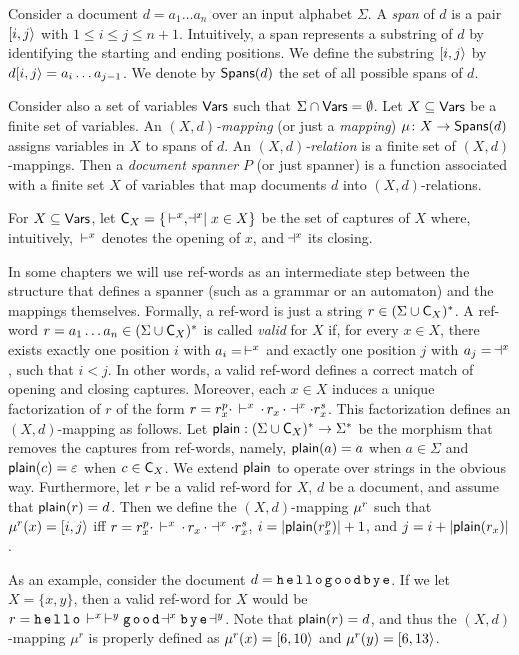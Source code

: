 Consider a document $d = a_1\ldots a_n$ over an input alphabet $\Sigma$. A {\it span} of $d$ is a pair $[i,j\rangle$ with $1 \leq i \leq j \leq n+1$. Intuitively, a span represents a substring of $d$ by identifying the starting and ending positions. We define the substring $[i,j\rangle$ by $d[i,j\rangle = a_i \ldots a_{j-1}$. We denote by $\mathsf{Spans}(d)$ the set of all possible spans of $d$.

Consider also a set of variables $\mathsf{Vars}$ such that $\Sigma \cap \mathsf{Vars} = \emptyset$. Let $X \subseteq \mathsf{Vars}$ be a finite set of variables. An \emph{$(X, d)$-mapping} (or just a \emph{mapping}) $\mu\colon X \rightarrow \mathsf{Spans}(d)$ assigns variables in $X$ to spans of $d$. An \emph{$(X, d)$-relation} is a finite set of $(X, d)$-mappings. Then a \emph{document spanner} $P$ (or just spanner) is a function associated with a finite set $X$ of variables that map documents $d$ into $(X, d)$-relations.  

For $X \subseteq \mathsf{Vars}$, let $\textsf{C}_{X} = \{\, \vdash^{x}, \!\dashv^{x}\mid x\in X\}$ be the set of captures of $X$ where, intuitively, $\, \vdash^{x}$ denotes the opening of $x$, and $\!\dashv^{x}$ its closing. 

In some chapters we will use ref-words as an intermediate step between the structure that defines a spanner (such as a grammar or an automaton) and the mappings themselves.
Formally, a ref-word is just a string $r\in (\Sigma \cup \textsf{C}_{X})^*$. A ref-word $r = a_1 \ldots a_n \in (\Sigma \cup \textsf{C}_{X})^*$ is called {\it valid} for $X$ if, for every $x \in X$, there exists exactly one position $i$ with $a_i = \, \vdash^{x}$ and exactly one position $j$ with $a_j = \ \!\dashv^{x}$, such that $i < j$. 
In other words, a valid ref-word defines a correct match of opening and closing captures. Moreover, each $x \in X$ induces a unique factorization of $r$ of the form $r = r_x^p \cdot \, \vdash^{x} \, \cdot \, r_x \, \cdot\, \!\dashv^{x} \cdot r_x^s$. 
This factorization defines an $(X,d)$-mapping as follows. 
Let $\textsf{plain}: (\Sigma \cup \textsf{C}_{X})^* \rightarrow \Sigma^*$ be the morphism that removes the captures from ref-words, namely, $\textsf{plain}(a) = a$ when $a \in \Sigma$ and $\textsf{plain}(c) = \varepsilon$ when $c \in \textsf{C}_{X}$.
We extend $\textsf{plain}$ to operate over strings in the obvious way.
Furthermore, let $r$ be a valid ref-word for $X$, $d$ be a document, and assume that $\textsf{plain}(r) = d$.
Then we define the $(X,d)$-mapping $\mu^r$ such that $\mu^r(x) = [i,j\rangle$ iff $r = r_x^p \cdot \, \vdash^{x} \, \cdot \, r_x \, \cdot\, \!\dashv^{x} \cdot r_x^s$, $i = |\textsf{plain}(r_x^p)|+1$, and $j = i + |\textsf{plain}(r_x)|$. 

As an example, consider the document $d = {\tt h\,e\,l\,l\,o\,g\,o\,o\,d\,b\,y\,e}$. 
If we let $X = \{x, y\}$, then a valid ref-word for $X$ would be $r = {\tt h\,e\,l\,l\,o}\, \vdash^{x}\, \vdash^{y}{\tt g\,o\,o\,d}\!\dashv^{x}{\tt b\,y\,e}\!\dashv^{y}$. Note that $\textsf{plain}(r) = d$, and thus the $(X,d)$-mapping $\mu^r$ is properly defined as $\mu^r(x) = [6,10\rangle$ and $\mu^r(y) = [6,13\rangle$.